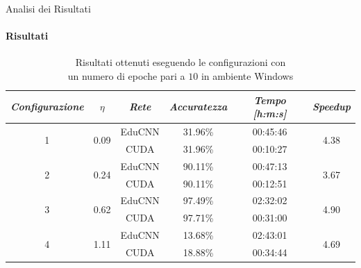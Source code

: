 \documentclass[
 ]{beamer}
\begin{document}
\begin{frame}{Analisi dei Risultati}
    \framesubtitle{Risultati}

        \begin{table}
            \centering
            \renewcommand\arraystretch{1.3}
            \small
            \begin{tabular}{| c | c | c | c | c | c |}
                \hline
                \emph{Configurazione} & $\eta$ & \emph{Rete} & \emph{Accuratezza} & \emph{Tempo [h:m:s]} & \emph{Speedup} \\
                \hline
                \multirow{2}{*}{1} & \multirow{2}{*}{0.09} & EduCNN & 31.96\% & 00:45:46 & \multirow{2}{*}{4.38} \\ \cline{3-5} 
                                   &                       & CUDA   & 31.96\% & 00:10:27 & \\
                \hline
                \multirow{2}{*}{2} & \multirow{2}{*}{0.24} & EduCNN & 90.11\% & 00:47:13 & \multirow{2}{*}{3.67} \\ \cline{3-5} 
                                   &                       & CUDA   & 90.11\% & 00:12:51 & \\
                \hline
                \multirow{2}{*}{3} & \multirow{2}{*}{0.62} & EduCNN & 97.49\% & 02:32:02 & \multirow{2}{*}{4.90} \\ \cline{3-5} 
                                   &                       & CUDA   & 97.71\% & 00:31:00 & \\
                \hline
                \multirow{2}{*}{4} & \multirow{2}{*}{1.11} & EduCNN & 13.68\% & 02:43:01 & \multirow{2}{*}{4.69} \\ \cline{3-5} 
                                   &                       & CUDA   & 18.88\% & 00:34:44 & \\
                \hline
            \end{tabular}
            \caption            
    {Risultati ottenuti eseguendo le configurazioni con \\ un numero di epoche pari a $10$ in ambiente Windows\endtabular}          
        \end{table}    
\end{frame}
\end{document}
